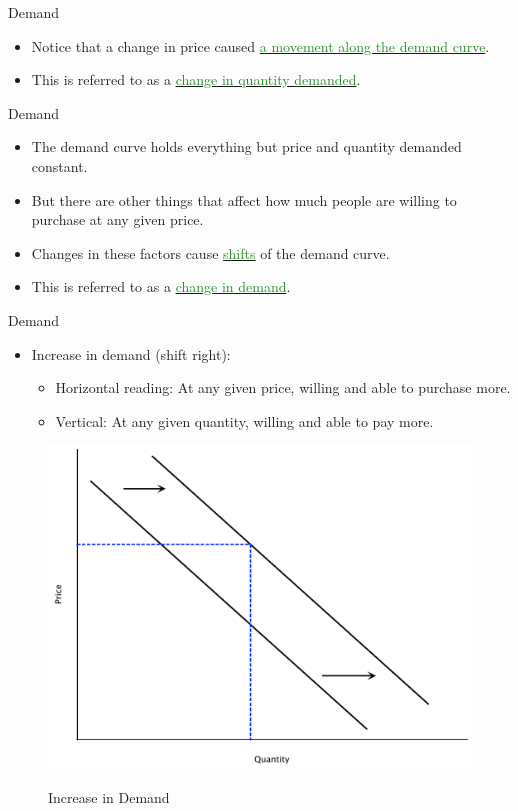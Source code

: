 \documentclass[xcolor={dvipsnames},pdf, hyperref={colorlinks=true, citecolor=ForestGreen, linkcolor=BlueViolet, urlcolor=Magenta}]{beamer}
\theoremstyle{definition}
\newcommand{\blank}[0]{}
\newcommand{\ddp}[1]{{\textcolor{ForestGreen}{#1}}}
\newcommand{\dd}[1]{{\underline{\textcolor{ForestGreen}{#1}}}}
\begin{document}
\begin{frame}{Demand}
	\begin{itemize}
	\item Notice that a change in price caused \dd{a movement along the demand curve}.
	\item This is referred to as a \dd{change in quantity demanded}.
\end{itemize}
\end{frame}
	
\begin{frame}{Demand}
		\begin{itemize}
			\item The demand curve holds everything but price and quantity demanded constant. 
			\item But there are other things that affect how much people are willing to purchase at any given price. 
			\item Changes in these factors cause \dd{shifts} of the demand curve. 
			\item This is referred to as a \dd{change in demand}.
		\end{itemize}
\end{frame}


	\begin{frame}{Demand}
	\begin{itemize}
		\item Increase in demand (shift right): 
		\begin{itemize}	
			\item Horizontal reading: At any given price, willing and able to purchase more. 
			\item Vertical: At any given quantity, willing and able to pay more. 
		\end{itemize}
	\end{itemize}
\blank 
\blank 
\blank 
\blank
	\begin{figure}
		\ddp{\includegraphics[scale=.25]{plot9.pdf}}
		\caption{Increase in Demand}
	\end{figure}
	
\end{frame}
	
\end{document}
